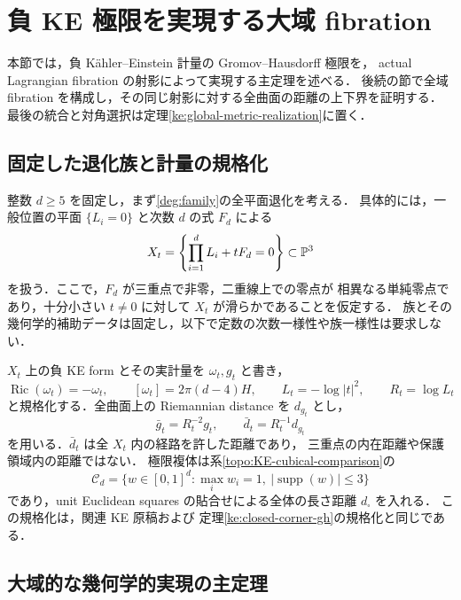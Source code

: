 \section{負 KE 極限を実現する大域 fibration}
\label{ke:global-realization-section}

本節では，負 Kähler--Einstein 計量の Gromov--Hausdorff 極限を，
actual Lagrangian fibration の射影によって実現する主定理を述べる．
後続の節で全域 fibration を構成し，その同じ射影に対する全曲面の距離の上下界を証明する．
最後の統合と対角選択は定理\ref{ke:global-metric-realization}に置く．

\subsection{固定した退化族と計量の規格化}

整数 $d\ge5$ を固定し，まず\eqref{deg:family}の全平面退化を考える．
具体的には，一般位置の平面 $\{L_i=0\}$ と次数 $d$ の式 $F_d$ による
\[
 X_t=\left\{\prod_{i=1}^dL_i+tF_d=0\right\}\subset\mathbb P^3
\]
を扱う．ここで，$F_d$ が三重点で非零，二重線上での零点が
相異なる単純零点であり，十分小さい $t\ne0$ に対して $X_t$ が滑らかであることを仮定する．
族とその幾何学的補助データは固定し，以下で定数の次数一様性や族一様性は要求しない．

$X_t$ 上の負 KE form とその実計量を $\omega_t,g_t$ と書き，
\[
 \operatorname{Ric}(\omega_t)=-\omega_t,\qquad
 [\omega_t]=2\pi(d-4)H,\qquad
 L_t=-\log|t|^2,\qquad R_t=\log L_t
\]
と規格化する．全曲面上の Riemannian distance を $d_{g_t}$ とし，
\[
 \bar g_t=R_t^{-2}g_t,\qquad \bar d_t=R_t^{-1}d_{g_t}
\]
を用いる．$\bar d_t$ は全 $X_t$ 内の経路を許した距離であり，
三重点の内在距離や保護領域内の距離ではない．
極限複体は系\ref{topo:KE-cubical-comparison}の
\[
 \mathcal C_d=
 \{w\in[0,1]^d:\max_i w_i=1,\ |\operatorname{supp}(w)|\le3\}
\]
であり，unit Euclidean squares の貼合せによる全体の長さ距離 $d_\square$ を入れる．
この規格化は，関連 KE 原稿\cite{KELocalCurrent,KECubicalCurrent}および
定理\ref{ke:closed-corner-gh}の規格化と同じである．

\subsection{大域的な幾何学的実現の主定理}

